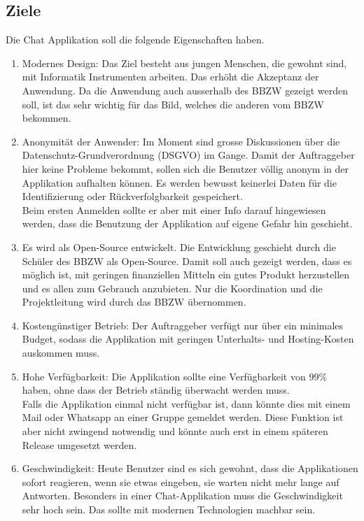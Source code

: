 \documentclass[12pt]{article}
\begin{document}
    \subsection{Ziele}
      Die Chat Applikation soll die folgende Eigenschaften haben.

      \begin{enumerate}
        \item Modernes Design: Das Ziel besteht aus jungen Menschen, die gewohnt sind, mit Informatik Instrumenten arbeiten. Das erhöht die Akzeptanz der Anwendung. Da die Anwendung auch ausserhalb des BBZW gezeigt werden soll, ist das sehr wichtig für das Bild, welches die anderen vom BBZW bekommen.
        \item Anonymität der Anwender:  Im Moment sind grosse Diskussionen über die Datenschutz-Grundverordnung (DSGVO) im Gange. Damit der Auftraggeber hier keine Probleme bekommt, sollen sich die Benutzer völlig anonym in der Applikation aufhalten können. Es werden bewusst keinerlei Daten für die Identifizierung oder Rückverfolgbarkeit gespeichert. \\
            Beim ersten Anmelden sollte er aber mit einer Info darauf hingewiesen werden, dass die Benutzung der Applikation auf eigene Gefahr hin geschieht.
        \item Es wird als Open-Source entwickelt. Die Entwicklung geschieht durch die Schüler des BBZW als Open-Source. Damit soll auch gezeigt werden, dass es möglich ist, mit geringen finanziellen Mitteln ein gutes Produkt herzustellen und es allen zum Gebrauch anzubieten. Nur die Koordination und die Projektleitung wird durch das BBZW übernommen.
        \item Kostengünstiger Betrieb: Der Auftraggeber verfügt nur über ein minimales Budget, sodass die Applikation mit geringen Unterhalts- und Hosting-Kosten auskommen muss.
        \item Hohe Verfügbarkeit: Die Applikation sollte eine Verfügbarkeit von 99\% haben, ohne dass der Betrieb ständig überwacht werden muss. \\
            Falls die Applikation einmal nicht verfügbar ist, dann könnte dies mit einem Mail oder Whatsapp an einer Gruppe gemeldet werden. Diese Funktion ist aber nicht zwingend notwendig und könnte auch erst in einem späteren Release umgesetzt werden.
        \item Geschwindigkeit: Heute Benutzer sind es sich gewohnt, dass die Applikationen sofort reagieren, wenn sie etwas eingeben, sie warten nicht mehr lange auf Antworten. Besonders in einer Chat-Applikation muss die Geschwindigkeit sehr hoch sein. Das sollte mit modernen Technologien machbar sein.
      \end{enumerate}
\end{document}
